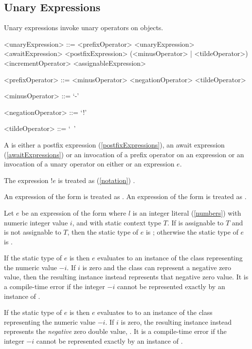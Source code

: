 \documentclass[makeidx]{article}
\begin{document}
{\subsection{Unary Expressions}

\LMHash{}%
Unary expressions invoke unary operators on objects.

\begin{grammar}
<unaryExpression> ::= <prefixOperator> <unaryExpression>
  \alt <awaitExpression>
  \alt <postfixExpression>
  \alt (<minusOperator> | <tildeOperator>) \SUPER{}
  \alt <incrementOperator> <assignableExpression>

<prefixOperator> ::= <minusOperator>
  \alt <negationOperator>
  \alt <tildeOperator>

<minusOperator> ::= `-'

<negationOperator> ::= `!'

<tildeOperator> ::= `~'
\end{grammar}

\LMHash{}%
A  is either a postfix expression
(\ref{postfixExpressions}),
an await expression (\ref{awaitExpressions})
or an invocation of a prefix operator on an expression
or an invocation of a unary operator on either \SUPER{} or an expression $e$.

\LMHash{}%
The expression $!e$ is treated as
(\ref{notation})
.

\LMHash{}%
An expression of the form  is treated as
.
An expression of the form  is treated as
.

\LMHash{}%
Let $e$ be an expression of the form 
where $l$ is an integer literal (\ref{numbers}) with numeric integer value $i$,
and with static context type $T$.
If  is assignable to $T$ and  is not assignable to $T$,
then the static type of $e$ is ;
otherwise the static type of $e$ is .

\LMHash{}%
If the static type of $e$ is  then $e$ evaluates to
an instance of the  class representing the numeric value $-i$.
If $i$ is zero and the  class can represent a negative zero value,
then the resulting instance instead represents that negative zero value.
It is a compile-time error if the integer $-i$ cannot be represented
exactly by an instance of .

\LMHash{}%
If the static type of $e$ is  then $e$ evaluates to
to an instance of the  class representing the numeric value $-i$.
If $i$ is zero, the resulting instance instead represents the
\emph{negative} zero double value, .
It is a compile-time error if the integer $-i$ cannot be represented
exactly by an instance of .

}
\end{document}
